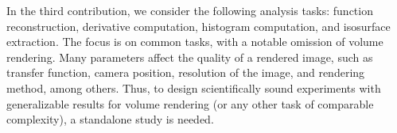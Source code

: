 In the third contribution, we consider the following analysis tasks: function reconstruction,
derivative computation, histogram computation, and isosurface extraction. The focus is on common
tasks, with a notable omission of volume rendering. Many parameters affect the quality of a rendered
image, such as transfer function, camera position, resolution of the image, and rendering method,
among others. Thus, to design scientifically sound experiments with generalizable results for volume
rendering (or any other task of comparable complexity), a standalone study is needed.

